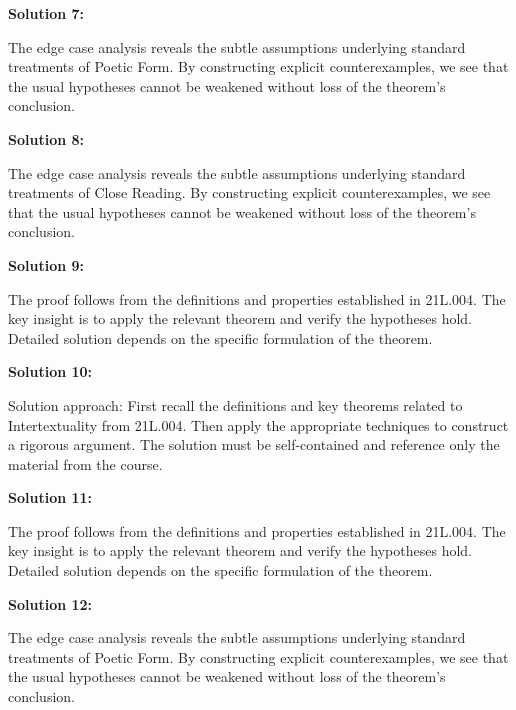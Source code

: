 \documentclass[12pt,a4paper]{exam}
\begin{document}
\vspace{0.5cm}

\textbf{Solution 7:}

The edge case analysis reveals the subtle assumptions underlying standard treatments of Poetic Form. By constructing explicit counterexamples, we see that the usual hypotheses cannot be weakened without loss of the theorem's conclusion.

\vspace{0.5cm}

\textbf{Solution 8:}

The edge case analysis reveals the subtle assumptions underlying standard treatments of Close Reading. By constructing explicit counterexamples, we see that the usual hypotheses cannot be weakened without loss of the theorem's conclusion.

\vspace{0.5cm}

\textbf{Solution 9:}

The proof follows from the definitions and properties established in 21L.004. The key insight is to apply the relevant theorem and verify the hypotheses hold. Detailed solution depends on the specific formulation of the theorem.

\vspace{0.5cm}

\textbf{Solution 10:}

Solution approach: First recall the definitions and key theorems related to Intertextuality from 21L.004. Then apply the appropriate techniques to construct a rigorous argument. The solution must be self-contained and reference only the material from the course.

\vspace{0.5cm}

\textbf{Solution 11:}

The proof follows from the definitions and properties established in 21L.004. The key insight is to apply the relevant theorem and verify the hypotheses hold. Detailed solution depends on the specific formulation of the theorem.

\vspace{0.5cm}

\textbf{Solution 12:}

The edge case analysis reveals the subtle assumptions underlying standard treatments of Poetic Form. By constructing explicit counterexamples, we see that the usual hypotheses cannot be weakened without loss of the theorem's conclusion.
\end{document}
